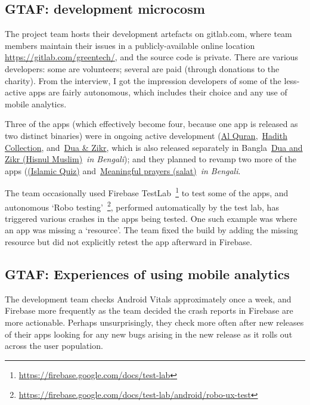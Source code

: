 \subsection{GTAF: development microcosm} 
The project team hosts their development artefacts on gitlab.com, where team members maintain their issues in a publicly-available online location \url{https://gitlab.com/greentech/}, and the source code is private. There are various developers: some are volunteers; several are paid (through donations to the charity). From the interview, I got the impression developers of some of the less-active apps are fairly autonomous, which includes their choice and any use of mobile analytics. 

Three of the apps (which effectively become four, because one app is released as two distinct binaries) were in ongoing active development (\href{https://play.google.com/store/apps/details?id=com.greentech.quran}{Al Quran},~\href{https://play.google.com/store/apps/details?id=com.greentech.hadith}{Hadith Collection}, and~\href{https://play.google.com/store/apps/details?id=com.greentech.hisnulmuslim}{Dua \& Zikr}, which is also released separately in Bangla~\href{https://play.google.com/store/apps/details?id=com.greentech.hisnulmuslimbn}{{Dua and Zikr (Hisnul Muslim)}}~\emph{in Bengali}); and they planned to revamp two more of the apps (\href{https://play.google.com/store/apps/details?id=com.greentech.islamicquiz}{(Islamic Quiz)} and~\href{https://play.google.com/store/apps/details?id=com.greentech.salatbn}{Meaningful prayers (salat)}~\textit{in Bengali}. %

The team occasionally used Firebase TestLab~\footnote{\url{https://firebase.google.com/docs/test-lab}} to test some of the apps, and autonomous `Robo testing'~\footnote{\url{https://firebase.google.com/docs/test-lab/android/robo-ux-test}}, performed automatically by the test lab, has triggered various crashes in the apps being tested. One such example was where an app was missing a `resource'. The team fixed the build by adding the missing resource but did not explicitly retest the app afterward in Firebase.  

\subsection{GTAF: Experiences of using mobile analytics}
The development team checks Android Vitals approximately once a week, and Firebase more frequently as the team decided the crash reports in Firebase are more actionable. Perhaps unsurprisingly, they check more often after new releases of their apps looking for any new bugs arising in the new release as it rolls out across the user population.

